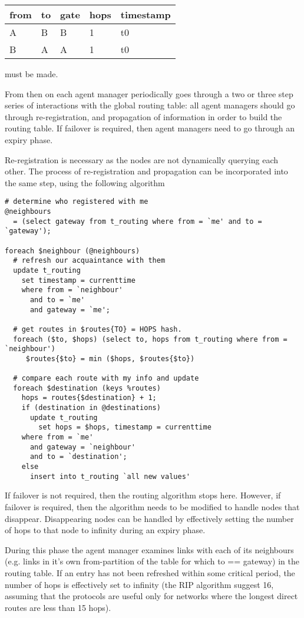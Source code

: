 \documentclass{cmspaper}
\begin{document}
\begin{tabular}{lllll}
from	& to	& gate	& hops	& timestamp	\\ \hline
A	& B	& B	& 1	& t0		\\
B	& A	& A	& 1	& t0
\end{tabular}

must be made.

From then on each agent manager periodically goes through a two or
three step series of interactions with the global routing table: all
agent managers should go through re-registration, and propagation of
information in order to build the routing table.  If failover is
required, then agent managers need to go through an expiry phase.

Re-registration is necessary as the nodes are not dynamically querying
each other.  The process of re-registration and propagation can be
incorporated into the same step, using the following algorithm

\begin{verbatim}
# determine who registered with me
@neighbours
  = (select gateway from t_routing where from = `me' and to = `gateway');

foreach $neighbour (@neighbours)
  # refresh our acquaintance with them
  update t_routing
    set timestamp = currenttime
    where from = `neighbour'
      and to = `me'
      and gateway = `me';

  # get routes in $routes{TO} = HOPS hash.
  foreach ($to, $hops) (select to, hops from t_routing where from = `neighbour')
     $routes{$to} = min ($hops, $routes{$to})

  # compare each route with my info and update
  foreach $destination (keys %routes)
    hops = routes{$destination} + 1;
    if (destination in @destinations)
      update t_routing
        set hops = $hops, timestamp = currenttime
	where from = `me'
	  and gateway = `neighbour'
	  and to = `destination';
    else
      insert into t_routing `all new values'
\end{verbatim}

If failover is not required, then the routing algorithm stops here.
However, if failover is required, then the algorithm needs to be
modified to handle nodes that disappear.  Disappearing nodes can be
handled by effectively setting the number of hops to that node to
infinity during an expiry phase.

During this phase the agent manager examines links with each of its
neighbours (e.g. links in it's own from-partition of the table for
which to == gateway) in the routing table.  If an entry has not been
refreshed within some critical period, the number of hops is
effectively set to infinity (the RIP algorithm suggest 16, assuming
that the protocols are useful only for networks where the longest
direct routes are less than 15 hops).
\end{document}
